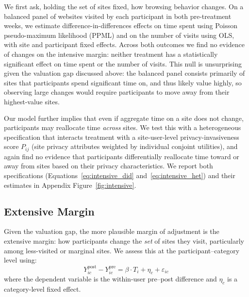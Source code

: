 \documentclass[12pt]{article}
\theoremstyle{definition}
\theoremstyle{remark}
\begin{document}
We first ask, holding the set of sites fixed, how browsing behavior changes. On a balanced panel of websites visited by each participant in both pre-treatment weeks, we estimate difference-in-differences effects on time spent using Poisson pseudo-maximum likelihood (PPML) and on the number of visits using OLS, with site and participant fixed effects. Across both outcomes we find no evidence of changes on the intensive margin: neither treatment has a statistically significant effect on time spent or the number of visits. This null is unsurprising given the valuation gap discussed above: the balanced panel consists primarily of sites that participants spend significant time on, and thus likely value highly, so observing large changes would require participants to move away from their highest-value sites.

Our model further implies that even if aggregate time on a site does not change, participants may reallocate time \emph{across} sites. We test this with a heterogeneous specification that interacts treatment with a site-user-level privacy-invasiveness score $P_{ij}$ (site privacy attributes weighted by individual conjoint utilities), and again find no evidence that participants differentially reallocate time toward or away from sites based on their privacy characteristics. We report both specifications (Equations~\eqref{eq:intensive_did} and~\eqref{eq:intensive_het}) and their estimates in Appendix Figure~\ref{fig:intensive}.

\subsection{Extensive Margin}
 
Given the valuation gap, the more plausible margin of adjustment is the extensive margin: how participants change the \emph{set} of sites they visit, particularly among less-visited or marginal sites. We assess this at the participant--category level using:
\begin{equation}\label{eq:extensive}
    Y^{\text{post}}_{ic} - Y^{\text{pre}}_{ic} = \beta \cdot T_i + \eta_c + \varepsilon_{ic}
\end{equation}
where the dependent variable is the within-user pre--post difference and $\eta_c$ is a category-level fixed effect.
\end{document}
